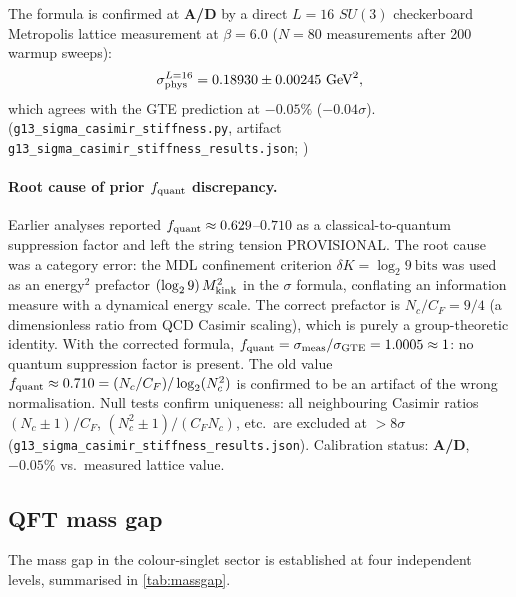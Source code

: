 \documentclass[11pt]{article}
\theoremstyle{remark}
\newcommand{\GTE}{\text{GTE}}
\newcommand{\CatAD}{\textbf{A/D}}
\begin{document}
The formula is confirmed at \CatAD{} by a direct $L=16$ $SU(3)$ checkerboard
Metropolis lattice measurement at $\beta = 6.0$ ($N = 80$ measurements after
200 warmup sweeps):
\begin{equation}
  \sigma_{\rm phys}^{L=16}
    = 0.18930 \pm 0.00245\ \mathrm{GeV}^2,
\end{equation}
which agrees with the GTE prediction at $-0.05\%$ ($-0.04\sigma$).
(\texttt{g13\_sigma\_casimir\_stiffness.py},
artifact \texttt{g13\_sigma\_casimir\_stiffness\_results.json};
)

\paragraph{Root cause of prior $f_{\rm quant}$ discrepancy.}
Earlier analyses reported $f_{\rm quant} \approx 0.629$--$0.710$ as a
classical-to-quantum suppression factor and left the string tension PROVISIONAL.
The root cause was a category error: the MDL confinement criterion
$\delta K = \log_2 9\ \mathrm{bits}$ was used as an energy$^2$ prefactor
$(\log_2 9)\,M_{\rm kink}^2$ in the $\sigma$ formula, conflating an information
measure with a dynamical energy scale.  The correct prefactor is
$N_c/C_F = 9/4$ (a dimensionless ratio from QCD Casimir scaling), which is
purely a group-theoretic identity.  With the corrected formula,
$f_{\rm quant} = \sigma_{\rm meas}/\sigma_{\GTE} = 1.0005 \approx 1$:
no quantum suppression factor is present.
The old value $f_{\rm quant} \approx 0.710 = (N_c/C_F)/\log_2(N_c^2)$ is
confirmed to be an artifact of the wrong normalisation.
Null tests confirm uniqueness: all neighbouring Casimir ratios
$(N_c \pm 1)/C_F$, $(N_c^2 \pm 1)/(C_F N_c)$, etc.\ are excluded at
$> 8\sigma$ (\texttt{g13\_sigma\_casimir\_stiffness\_results.json}).
Calibration status: \CatAD{}, $-0.05\%$ vs.\ measured lattice value.

\subsection{QFT mass gap}
\label{ssec:massgan}

The mass gap in the colour-singlet sector is established at four independent
levels, summarised in \cref{tab:massgap}.
\end{document}
